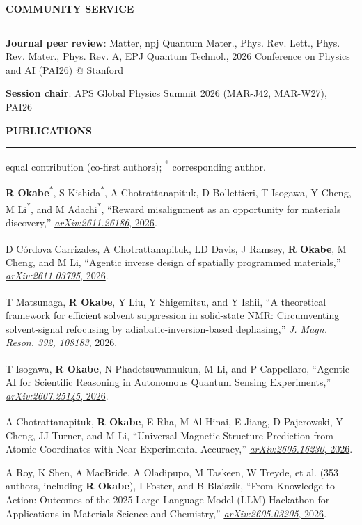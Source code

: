 \documentclass[10pt,a4paper]{article}
\newcommand{\cvsection}[1]{%
  \needspace{3\baselineskip}%
  \vspace{4pt}%
  {\normalsize\bfseries\MakeUppercase{#1}}\par
  \vspace{-6pt}\noindent\rule{\linewidth}{0.6pt}\par
  \vspace{-4pt}}
\newcommand{\cofirst}{\textsuperscript{\dag}}
\newcommand{\me}{\textbf{R Okabe}}
\newcommand{\corr}{\textsuperscript{*}}
\begin{document}
\cvsection{Community Service}
\begin{cvitems}
  \item \textbf{Journal peer review}: Matter, npj Quantum Mater., Phys. Rev. Lett., Phys. Rev. Mater., Phys. Rev. A, EPJ Quantum Technol., 2026 Conference on Physics and AI (PAI26) @ Stanford
  \item \textbf{Session chair}: APS Global Physics Summit 2026 (MAR-J42, MAR-W27), PAI26
\end{cvitems}

\cvsection{Publications}
{\footnotesize \cofirst{} equal contribution (co-first authors); \corr{} corresponding author.}
\begin{cvenum}
  \item \me\cofirst\corr, S Kishida\cofirst\corr, A Chotrattanapituk, D Bollettieri, T Isogawa, Y Cheng, M Li\corr, and M Adachi\corr, ``Reward misalignment as an opportunity for materials discovery,'' \href{https://arxiv.org/abs/2611.26186}{\textit{arXiv:2611.26186}, 2026}.
  \item D Córdova Carrizales\cofirst, A Chotrattanapituk\cofirst, LD Davis, J Ramsey, \me, M Cheng, and M Li, ``Agentic inverse design of spatially programmed materials,'' \href{https://arxiv.org/abs/2611.03795}{\textit{arXiv:2611.03795}, 2026}.
  \item T Matsunaga\cofirst, \me\cofirst, Y Liu, Y Shigemitsu, and Y Ishii, ``A theoretical framework for efficient solvent suppression in solid-state NMR: Circumventing solvent-signal refocusing by adiabatic-inversion-based dephasing,'' \href{https://doi.org/10.1016/j.jmr.2026.108183}{\textit{J. Magn. Reson. 392, 108183}, 2026}.
  \item T Isogawa\cofirst, \me\cofirst, N Phadetsuwannukun, M Li, and P Cappellaro, ``Agentic AI for Scientific Reasoning in Autonomous Quantum Sensing Experiments,'' \href{https://arxiv.org/abs/2607.25145}{\textit{arXiv:2607.25145}, 2026}.
  \item A Chotrattanapituk\cofirst, \me\cofirst, E Rha, M Al-Hinai, E Jiang, D Pajerowski, Y Cheng, JJ Turner, and M Li, ``Universal Magnetic Structure Prediction from Atomic Coordinates with Near-Experimental Accuracy,'' \href{https://arxiv.org/abs/2605.16230}{\textit{arXiv:2605.16230}, 2026}.
  \item A Roy, K Shen, A MacBride, A Oladipupo, M Taskeen, W Treyde, et al. (353 authors, including \me), I Foster, and B Blaiszik, ``From Knowledge to Action: Outcomes of the 2025 Large Language Model (LLM) Hackathon for Applications in Materials Science and Chemistry,'' \href{https://arxiv.org/abs/2605.03205}{\textit{arXiv:2605.03205}, 2026}.

\end{cvenum}
\end{document}
